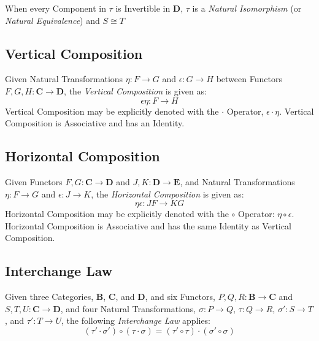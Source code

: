 When every Component in $\tau$ is Invertible in $\mathbf{D}$, $\tau$
is a \emph{Natural Isomorphism} (or \emph{Natural Equivalence}) and $S
\cong T$



\subsection{Vertical Composition}\label{sec:vertical_composition}

Given Natural Transformations $\eta : F \rightarrow G$ and $\epsilon :
G \rightarrow H$ between Functors $F,G,H : \mathbf{C} \rightarrow
\mathbf{D}$, the \emph{Vertical Composition} is given as:
\[
    \epsilon \eta : F \rightarrow H
\]
Vertical Composition may be explicitly denoted with the $\cdot$
Operator, $\epsilon \cdot \eta$. Vertical Composition is Associative
and has an Identity.



\subsection{Horizontal Composition}\label{sec:horizontal_composition}

Given Functors $F,G : \mathbf{C} \rightarrow \mathbf{D}$ and $J,K :
\mathbf{D} \rightarrow \mathbf{E}$, and Natural Transformations $\eta
: F \rightarrow G$ and $\epsilon : J \rightarrow K$, the
\emph{Horizontal Composition} is given as:
\[
    \eta \epsilon : JF \rightarrow KG
\]
Horizontal Composition may be explicitly denoted with the $\circ$
Operator: $\eta \circ \epsilon$. Horizontal Composition is Associative
and has the same Identity as Vertical Composition.



\subsection{Interchange Law}\label{sec:interchange_law}

Given three Categories, $\mathbf{B}$, $\mathbf{C}$, and $\mathbf{D}$,
and six Functors, $P,Q,R : \mathbf{B} \rightarrow \mathbf{C}$ and
$S,T,U : \mathbf{C} \rightarrow \mathbf{D}$, and four Natural
Transformations, $\sigma : P \rightarrow Q$, $\tau : Q \rightarrow R$,
$\sigma' : S \rightarrow T$, and $\tau' : T \rightarrow U$, the
following \emph{Interchange Law} applies:
\[
    (\tau' \cdot \sigma') \circ (\tau \cdot \sigma) =
    (\tau' \circ \tau) \cdot (\sigma' \circ \sigma)
\]



